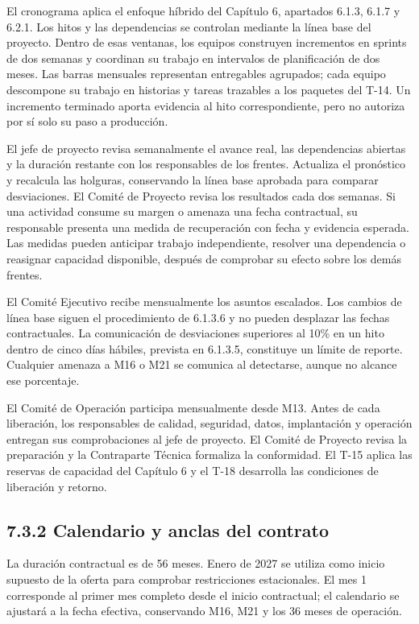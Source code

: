 \documentclass[11pt]{article}
\begin{document}
El cronograma aplica el enfoque híbrido del Capítulo 6, apartados 6.1.3, 6.1.7 y 6.2.1. Los hitos y las dependencias se controlan mediante la línea base del proyecto. Dentro de esas ventanas, los equipos construyen incrementos en sprints de dos semanas y coordinan su trabajo en intervalos de planificación de dos meses. Las barras mensuales representan entregables agrupados; cada equipo descompone su trabajo en historias y tareas trazables a los paquetes del T-14. Un incremento terminado aporta evidencia al hito correspondiente, pero no autoriza por sí solo su paso a producción.

El jefe de proyecto revisa semanalmente el avance real, las dependencias abiertas y la duración restante con los responsables de los frentes. Actualiza el pronóstico y recalcula las holguras, conservando la línea base aprobada para comparar desviaciones. El Comité de Proyecto revisa los resultados cada dos semanas. Si una actividad consume su margen o amenaza una fecha contractual, su responsable presenta una medida de recuperación con fecha y evidencia esperada. Las medidas pueden anticipar trabajo independiente, resolver una dependencia o reasignar capacidad disponible, después de comprobar su efecto sobre los demás frentes.

El Comité Ejecutivo recibe mensualmente los asuntos escalados. Los cambios de línea base siguen el procedimiento de 6.1.3.6 y no pueden desplazar las fechas contractuales. La comunicación de desviaciones superiores al 10\% en un hito dentro de cinco días hábiles, prevista en 6.1.3.5, constituye un límite de reporte. Cualquier amenaza a M16 o M21 se comunica al detectarse, aunque no alcance ese porcentaje.

El Comité de Operación participa mensualmente desde M13. Antes de cada liberación, los responsables de calidad, seguridad, datos, implantación y operación entregan sus comprobaciones al jefe de proyecto. El Comité de Proyecto revisa la preparación y la Contraparte Técnica formaliza la conformidad. El T-15 aplica las reservas de capacidad del Capítulo 6 y el T-18 desarrolla las condiciones de liberación y retorno.

\subsection{7.3.2 Calendario y anclas del contrato}

La duración contractual es de 56 meses. Enero de 2027 se utiliza como inicio supuesto de la oferta para comprobar restricciones estacionales. El mes 1 corresponde al primer mes completo desde el inicio contractual; el calendario se ajustará a la fecha efectiva, conservando M16, M21 y los 36 meses de operación.
\end{document}
